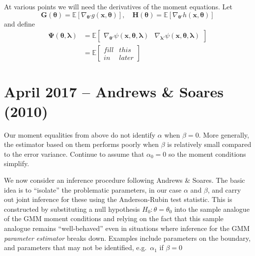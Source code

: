 \documentclass[12pt]{article}
\begin{document}
At various points we will need the derivatives of the moment equations.
Let
\[
  \mathbf{G}(\boldsymbol{\theta}) = \mathbb{E}[\nabla_{\boldsymbol{\theta}'} g(\mathbf{x},\boldsymbol{\theta})], \quad \mathbf{H}(\boldsymbol{\theta}) = \mathbb{E}[\nabla_{\boldsymbol{\theta}'} h(\mathbf{x},\boldsymbol{\theta})]
\]
and define 
\begin{align*}
  \boldsymbol{\Psi}(\boldsymbol{\theta}, \boldsymbol{\lambda}) &= \mathbb{E}
  \left[
  \begin{array}{cc}
    \nabla_{\boldsymbol{\theta}'} \psi(\mathbf{x}, \boldsymbol{\theta}, \boldsymbol{\lambda}) &
    \nabla_{\boldsymbol{\lambda}'} \psi(\mathbf{x}, \boldsymbol{\theta}, \boldsymbol{\lambda}) 
  \end{array}
\right]\\
&= \mathbb{E}\left[
\begin{array}{cc}
 fill & this \\
 in & later
\end{array}
\right]
\end{align*}

\section{April 2017 -- Andrews \& Soares (2010)}
Our moment equalities from above do not identify $\alpha$ when $\beta=0$.
More generally, the estimator based on them performs poorly when $\beta$ is relatively small compared to the error variance.
Continue to assume that $\alpha_0 = 0$ so the moment conditions simplify.

We now consider an inference procedure following Andrews \& Soares.
The basic idea is to ``isolate'' the problematic parameters, in our case $\alpha$ and $\beta$, and carry out joint inference for these using the Anderson-Rubin test statistic.
This is constructed by substituting a null hypothesis $H_0\colon \theta = \theta_0$ into the sample analogue of the GMM moment conditions and relying on the fact that this sample analogue remains ``well-behaved'' even in situations where inference for the GMM \emph{parameter estimator} breaks down.
Examples include parameters on the boundary, and parameters that may not be identified, e.g.\ $\alpha_1$ if $\beta = 0$
\end{document}
